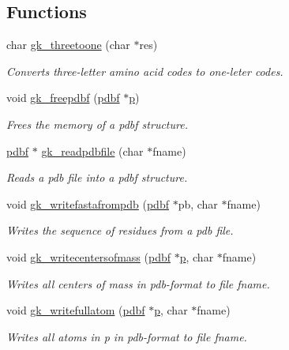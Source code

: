 \subsection*{Functions}
\begin{DoxyCompactItemize}
\item 
char \hyperlink{a00125_a6eb7d344c153ba6c0bbe608c18a4a2a1}{gk\+\_\+threetoone} (char $\ast$res)
\begin{DoxyCompactList}\small\item\em Converts three-\/letter amino acid codes to one-\/leter codes. \end{DoxyCompactList}\item 
void \hyperlink{a00125_ab49542f55191276b91d65ad61a198ab2}{gk\+\_\+freepdbf} (\hyperlink{a00666}{pdbf} $\ast$\hyperlink{a00614_a1e0420801cd5156c14e085b87a4945f5}{p})
\begin{DoxyCompactList}\small\item\em Frees the memory of a pdbf structure. \end{DoxyCompactList}\item 
\hyperlink{a00666}{pdbf} $\ast$ \hyperlink{a00125_a297ec0561d579a1772f424fce8886d96}{gk\+\_\+readpdbfile} (char $\ast$fname)
\begin{DoxyCompactList}\small\item\em Reads a pdb file into a pdbf structure. \end{DoxyCompactList}\item 
void \hyperlink{a00125_a39b1b4f30c03454894d5218edd8296e0}{gk\+\_\+writefastafrompdb} (\hyperlink{a00666}{pdbf} $\ast$pb, char $\ast$fname)
\begin{DoxyCompactList}\small\item\em Writes the sequence of residues from a pdb file. \end{DoxyCompactList}\item 
void \hyperlink{a00125_a6be4d6cf94a1dace5677865e8958b7b3}{gk\+\_\+writecentersofmass} (\hyperlink{a00666}{pdbf} $\ast$\hyperlink{a00614_a1e0420801cd5156c14e085b87a4945f5}{p}, char $\ast$fname)
\begin{DoxyCompactList}\small\item\em Writes all centers of mass in pdb-\/format to file fname. \end{DoxyCompactList}\item 
void \hyperlink{a00125_a786192984ea62e6824ae9a2d1b902574}{gk\+\_\+writefullatom} (\hyperlink{a00666}{pdbf} $\ast$\hyperlink{a00614_a1e0420801cd5156c14e085b87a4945f5}{p}, char $\ast$fname)
\begin{DoxyCompactList}\small\item\em Writes all atoms in p in pdb-\/format to file fname. \end{DoxyCompactList}\item 

\end{DoxyCompactItemize}
